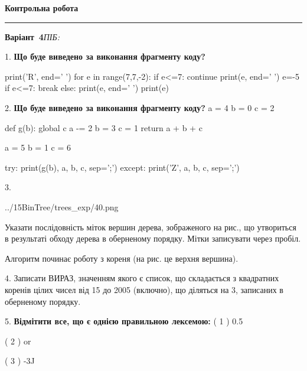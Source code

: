 \documentclass[11pt]{article}
\begin{document}
{\centering\Large\bfseries Контрольна робота\par}
\medskip
\noindent\rule{\linewidth}{0.5pt}
\smallskip
\noindent\textbf{Варіант \No\,4}\hfill \textit{ПІБ:}\,\underline{\hspace{60mm}}
\vspace{4mm}

1. \textbf{Що буде виведено за виконання фрагменту коду?}

print('R', end=' ')
for e in range(7,7,-2):
    if e<=7:
        continue
        print(e, end=' ')
        e=-5
    if e<=7:
        break
    else:
        print(e, end=' ')
    print(e)
\par\vspace{5mm}

2. \textbf{Що буде виведено за виконання фрагменту коду?}
a = 4
b = 0
c = 2

def g(b):
global c    a -= 2
    b = 3
    c = 1
    return a + b + c

a = 5
b = 1
c = 6

try:
    print(g(b), a, b, c, sep=';')
except:
    print('Z', a, b, c, sep=';')
\par\vspace{5mm}

3. 

\begin{center}
	{../15BinTree/trees_exp/40.png}
\end{center}
Указати послідовність міток вершин дерева, зображеного на рис., що утвориться в результаті обходу дерева в оберненому порядку. Мітки записувати через пробіл.\par Алгоритм починає роботу з кореня (на рис. це верхня вершина).
\par\vspace{5mm}

4. 
Записати ВИРАЗ, значенням якого є список, що складається з квадратних коренів цілих чисел від 15 до 2005 (включно), що діляться на 3, записаних в оберненому порядку.\par\vspace{5mm}

5. %
\textbf{Відмітити все, що є однією правильною лексемою:}
( 1 ) 0.5

( 2 ) or

( 3 ) -3J
\end{document}
